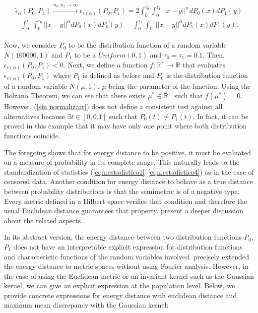 \documentclass[11pt]{article}
\begin{document}
\begin{appendices}
\begin{gather*}\label{limitesinnormalizar}
\begin{align}
\tilde{\epsilon}_{\alpha}(P_0,P_1)\overset{n_0,n_1\to \infty}{\to} \epsilon_{c(\alpha)}(P_0,P_1)= 2\int_{0}^{\tau_0} \int_{0}^{\tau_1}	 ||x-y||^{\alpha} dP_0(x) dP_1(y)\\
-\int_{0}^{\tau_0} \int_{0}^{\tau_0}	 ||x-y||^{\alpha} dP_0(x) dP_0(y) -\int_{0}^{\tau_1}\int_{0}^{\tau_1}	 ||x-y||^{\alpha} dP_1(x) dP_1(y). 
\end{align}
\end{gather*}

Now, we consider $P_0$ to be the distribution function of a random variable $N(100000,1)$ and $P_1$ to be  a $Uniform(0,1)$ and $\tau_0=\tau_1=0.1$. Then,  $\epsilon_{c(\alpha)}(P_0,P_1)<0$. Next, we  define a function  $f:\mathbb{R}^{+}\to \mathbb{R}$ that evaluates $\epsilon_{c(\alpha)}(P_0,P_1)$ where $P_1$ is defined as before and $P_0$ is the distribution function of a random variable $N(\mu,1)$,  $\mu$ being the parameter of the function. Using the Bolzano Theorem, we can see that there exists $\mu^{*}\in \mathbb{R}^{+}$ such that $f(\mu^{*})=0$. However, (\ref{sin normalizarr}) does not define a consistent test against all alternatives because $\exists t\in [0,0.1]$ such that $P_0(t)\neq P_1(t)$. In fact, it can be proved in this example that it may have only one point where both distribution functions coincide.




The foregoing shows that for  energy distance to be positive, it must be evaluated on a measure of probability in its complete range. This naturally leads to the standardization of statistics (\ref{eqn:estadistico1}--\ref{eqn:estadistico4}) as in the case of censored data. Another condition for   energy distance to behave as a true distance between probability distributions is that the semimetric is of a negative type. Every metric defined in a Hilbert space verifies that condition and therefore the usual Euclidean distance guarantees that property. \cite{lyons2013distance} present a deeper discussion about the related aspects.

In its abstract version, the energy distance between two distribution functions $P_0$, $P_1$ does not have an interpretable explicit expression for distribution functions and characteristic functions of the random variables  involved. \cite{lyons2013distance} precisely extended the energy distance to metric spaces without using Fourier analysis. However, in the case of using the Euclidean metric or  an invariant kernel such as the Gaussian kernel, we can give an explicit expression at the population level. Below, we provide  concrete expressions for energy distance with euclidean distance and maximun mean discrepancy with the Gaussian kernel: 






\end{appendices}
\end{document}
